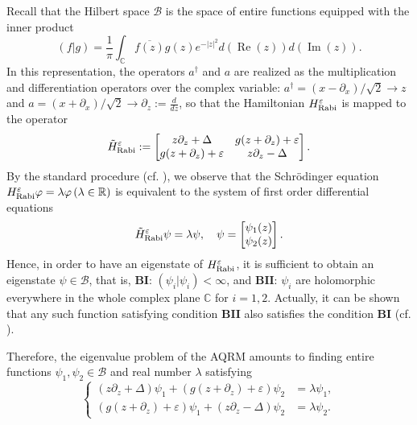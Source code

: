 \documentclass[11pt]{article}
\numberwithin{equation}{section}
\newcommand{\R}{\mathbb{R}} %
\newcommand{\C}{\mathbb{C}} %
\newcommand{\e}{\varepsilon}
\newcommand{\HRabi}[1]{H_{\text{\upshape Rabi}}^{#1}} %
\newcommand{\tHRabi}[1]{\tilde H_{\text{\upshape Rabi}}^{#1}} %
\DeclareMathOperator{\RE}{Re}
\DeclareMathOperator{\IM}{Im}
\newcommand{\Bargmann}{\mathcal{B}}
\theoremstyle{plain}
\theoremstyle{definition}
\theoremstyle{remark}
\begin{document}
Recall that the Hilbert space $\Bargmann$ is the space of entire functions equipped with the inner product
\[
  (f|g)= \frac1\pi \int_{\C} \overline{f(z)}g(z)e^{-|z|^2}d(\RE(z))d(\IM(z)).
\]
In this representation, the operators $a^\dag$ and $a$ are realized as the
multiplication and differentiation operators over the complex variable: $a^\dag = (x-\partial_x)/\sqrt2 \to z$ and $a= (x+\partial_x)/\sqrt2 \to \partial_z:=\frac{d}{dz}$,
so that the Hamiltonian \(\HRabi{\e}\) is mapped to the operator
\[
\tHRabi{\e} :=  \begin{bmatrix}
    z \partial_z + \Delta & g(z + \partial_z) + \e  \\
    g(z+\partial_z) + \e  & z \partial_z - \Delta
  \end{bmatrix}.
\]
By the standard procedure (cf. \cite{B2013AP,LB2015JPA}), we observe that the Schr\"odinger equation
$\HRabi{\e}\varphi=\lambda \varphi \, (\lambda \in \R)$ is equivalent to the system of first order differential equations
\begin{equation*}
\tHRabi{\e}\psi=\lambda \psi, \quad
\psi=  \begin{bmatrix}
 \psi_{1}(z) \\
 \psi_{2}(z)
\end{bmatrix}.
\end{equation*}
Hence, in order to have an eigenstate of $\HRabi{\e}$, it is sufficient to obtain an eigenstate
$\psi \in \Bargmann$, that is, $\mathbf{BI}$: $(\psi_i|\psi_i) <\infty $, and $\mathbf{BII}$: $\psi_i$ are holomorphic everywhere in the whole complex
plane $\C$ for $i=1,2$. Actually, it can be shown that any such function satisfying condition $\mathbf{BII}$ also satisfies
the condition $\mathbf{BI}$ (cf. \cite{B2013AP}).

Therefore, the eigenvalue problem of the AQRM amounts to finding entire functions \(\psi_1,\psi_2 \in \Bargmann\) and real number
\( \lambda \) satisfying
\begin{equation*}
  \left\{
  \begin{aligned}
    (z \partial_z + \Delta) \psi_1 + (g (z + \partial_z) + \e) \psi_2 &= \lambda \psi_1, \\
    (g (z + \partial_z) + \e) \psi_1 + (z \partial_z - \Delta) \psi_2 &= \lambda \psi_2.
  \end{aligned}
  \right.
\end{equation*}
\end{document}
